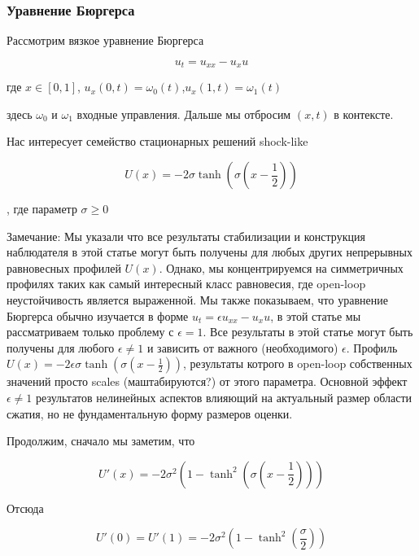\subsubsection{Уравнение Бюргерса}

Рассмотрим вязкое уравнение Бюргерса

\begin{equation}
  u_t = u_{xx} - u_xu
\end{equation}

где $x \in [0, 1]$, $u_x(0, t) = \omega_0(t)$,\quad $u_x(1, t) = \omega_1(t)$

здесь $\omega_0$ и $\omega_1$ входные управления. Дальше мы отбросим $(x, t)$ в контексте.

Нас интересует семейство стационарных решений shock-like

\begin{equation}\label{static}
  U(x) = -2\sigma\tanh{(\sigma(x - \frac{1}{2}))}
\end{equation}

, где параметр $\sigma \ge 0$


Замечание: Мы указали что все результаты стабилизации и конструкция наблюдателя в этой статье могут быть получены для любых других непрерывных равновесных профилей $U(x)$. Однако, мы концентрируемся на симметричных профилях таких как самый интересный класс равновесия, где open-loop неустойчивость является выраженной. Мы также показываем, что уравнение Бюргерса обычно изучается в форме $u_t = \epsilon u_{xx} - u_xu$, в этой статье мы рассматриваем только проблему с $\epsilon = 1$. Все результаты в этой статье могут быть получены для любого $\epsilon \ne 1$ и зависить от важного (необходимого) $\epsilon$. Профиль $U(x) = -2\epsilon\sigma\tanh{(\sigma(x - \frac{1}{2}))}$, результаты котрого в open-loop собственных значений просто scales (маштабируются?) от этого параметра. Основной эффект $\epsilon \ne 1$ результатов нелинейных аспектов влияющий на актуальный размер области сжатия, но не фундаментальную форму размеров оценки.

Продолжим, сначало мы заметим, что 

\begin{equation}
  U'(x) = -2\sigma^2(1 - \tanh^2{(\sigma(x - \frac{1}{2}))})
\end{equation}

Отсюда

\begin{equation}
  U'(0) = U'(1) = -2\sigma^2(1 - \tanh^2{(\frac{\sigma}{2})})
\end{equation}

